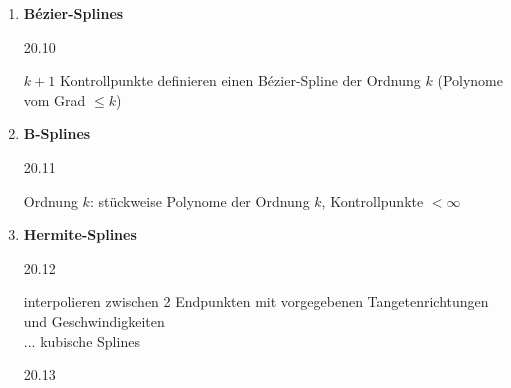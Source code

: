 \begin{enumerate}
\item \textbf{Bézier-Splines}
	\begin{center}
	20.10
	\end{center}
	$k+1$ Kontrollpunkte definieren einen Bézier-Spline der Ordnung $k$ (Polynome vom Grad $\le k$)
\item \textbf{B-Splines}
	\begin{center}
	 20.11
	\end{center}
	Ordnung $k$: stückweise Polynome der Ordnung $k$, Kontrollpunkte $< \infty$
\item \textbf{Hermite-Splines}
	\begin{center}
	 20.12
	\end{center}
	interpolieren zwischen 2 Endpunkten mit vorgegebenen Tangetenrichtungen und Geschwindigkeiten\\
	$...$ kubische Splines
	\begin{center}
	 20.13
	\end{center}

\end{enumerate}